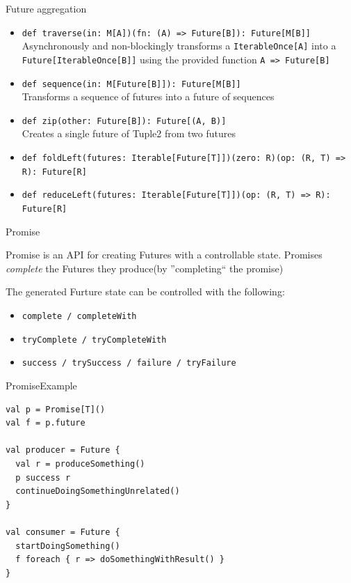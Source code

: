 \documentclass[aspectratio=169]{beamer}
\begin{document}
\begin{frame}{Future aggregation}
\begin{itemize}
  \item \texttt{def traverse(in: M[A])(fn: (A) => Future[B]): Future[M[B]]}\\
    \footnotesize Asynchronously and non-blockingly transforms a \texttt{IterableOnce[A]} into a
    \texttt{Future[IterableOnce[B]]} using the provided function \texttt{A => Future[B]}
  \item \texttt{def sequence(in: M[Future[B]]): Future[M[B]]}\\
    \footnotesize Transforms a sequence of futures into a future of sequences
  \item \texttt{def zip(other: Future[B]): Future[(A, B)]}\\
    \footnotesize Creates a single future of Tuple2 from two futures
  \item \texttt{def foldLeft(futures: Iterable[Future[T]])(zero: R)(op: (R, T) => R): Future[R]}
  \item \texttt{def reduceLeft(futures: Iterable[Future[T]])(op: (R, T) => R): Future[R]}
\end{itemize}
\end{frame}

\begin{frame}{Promise}
  \begin{block}{}
    Promise is an API for creating Futures with a controllable state. Promises \textit{complete} the
    Futures they produce(by ''completing`` the promise)
  \end{block}
  The generated Furture state can be controlled with the following:
  \begin{itemize}
    \item \texttt{complete / completeWith}
    \item \texttt{tryComplete / tryCompleteWith}
    \item \texttt{success / trySuccess / failure / tryFailure}
  \end{itemize}
\end{frame}

\begin{frame}[fragile]{Promise}{Example}
\begin{verbatim}
val p = Promise[T]()
val f = p.future

val producer = Future {
  val r = produceSomething()
  p success r
  continueDoingSomethingUnrelated()
}

val consumer = Future {
  startDoingSomething()
  f foreach { r => doSomethingWithResult() }
}
\end{verbatim}
\end{frame}
\end{document}

